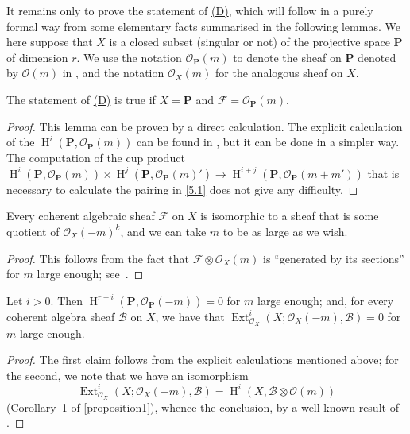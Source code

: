\documentclass{article}
\theoremstyle{plain}
\newenvironment{lemma}[1]
  {\renewcommand\theinnercustomlemma{#1}\innercustomlemma}
  {\endinnercustomlemma}
\theoremstyle{definition}
\newcommand{\sh}[1]{{\mathscr{#1}}}
\newcommand{\bb}{\mathbf}
\DeclareMathOperator{\Ext}{Ext}
\DeclareMathOperator{\HH}{H}
\begin{document}
It remains only to prove the statement of \hyperref[(D)]{(D)}, which will follow in a purely formal way from some elementary facts summarised in the following lemmas.
We here suppose that $X$ is a closed subset (singular or not) of the projective space $\bb{P}$ of dimension $r$.
We use the notation $\sh{O}_\bb{P}(m)$ to denote the sheaf on $\bb{P}$ denoted by $\sh{O}(m)$ in \cite{3}, and the notation $\sh{O}_X(m)$ for the analogous sheaf on $X$.

\begin{lemma}{2}
\label{lemma2}
  The statement of \hyperref[(D)]{(D)} is true if $X=\bb{P}$ and $\sh{F}=\sh{O}_\bb{P}(m)$.
\end{lemma}

\begin{proof}
  This lemma can be proven by a direct calculation.
  The explicit calculation of the $\HH^i(\bb{P},\sh{O}_\bb{P}(m))$ can be found in \cite{3}, but it can be done in a simpler way.
  The computation of the cup product $\HH^i(\bb{P},\sh{O}_\bb{P}(m))\times\HH^j(\bb{P},\sh{O}_\bb{P}(m)') \to \HH^{i+j}(\bb{P},\sh{O}_\bb{P}(m+m'))$ that is necessary to calculate the pairing in \cref{5.1} does not give any difficulty.
\end{proof}

\begin{lemma}{3}
\label{lemma3}
  Every coherent algebraic sheaf $\sh{F}$ on $X$ is isomorphic to a sheaf that is some quotient of $\sh{O}_X(-m)^k$, and we can take $m$ to be as large as we wish.
\end{lemma}

\begin{proof}
  This follows from the fact that $\sh{F}\otimes\sh{O}_X(m)$ is ``generated by its sections'' for $m$ large enough; see~\cite{3}.
\end{proof}

\begin{lemma}{4}
\label{lemma4}
  Let $i>0$.
  Then $\HH^{r-i}(\bb{P},\sh{O}_\bb{P}(-m))=0$ for $m$ large enough;
  and, for every coherent algebra sheaf $\sh{B}$ on $X$, we have that $\Ext_{\sh{O}_X}^i(X;\sh{O}_X(-m),\sh{B})=0$ for $m$ large enough.
\end{lemma}

\begin{proof}
  The first claim follows from the explicit calculations mentioned above;
  for the second, we note that we have an isomorphism
  \[
    \Ext_{\sh{O}_X}^i(X;\sh{O}_X(-m),\sh{B}) = \HH^i(X,\sh{B}\otimes\sh{O}(m))
  \]
  (\hyperref[proposition1corollary1]{Corollary~1} of \cref{proposition1}), whence the conclusion, by a well-known result of \cite{3}.
\end{proof}
\end{document}
